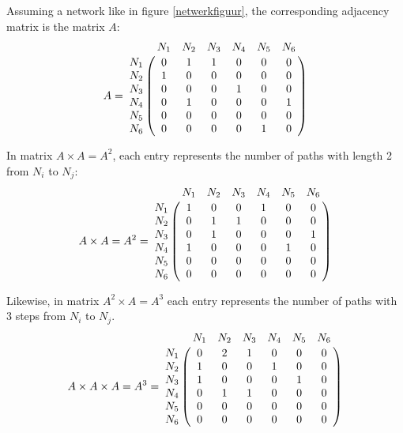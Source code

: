 Assuming a network like in figure \ref{netwerkfiguur}, the corresponding adjacency matrix is the  matrix $A$: \\

\begin{equation}
A =
\bordermatrix{
         & N_1		& N_2	& N_3	& N_4 	& N_5	&N_6     \cr
    N_1   & 0		& 1		& 1		& 0		& 0		& 0	     \cr
    N_2   & 1		& 0		& 0		& 0		& 0		& 0	     \cr
    N_3   & 0		& 0		& 0		& 1		& 0		& 0	     \cr
    N_4   & 0		& 1		& 0		& 0		& 0		& 1	     \cr
	N_5   & 0		& 0		& 0		& 0		& 0		& 0	     \cr
	N_6   & 0		& 0		& 0		& 0		& 1		& 0	     \cr
}
\end{equation}

In matrix $A \times A = A^{2}$, each entry represents the number of  paths with length 2 from $N_{i}$ to $N_{j}$:\\


\begin{equation}
 A \times A = A^{2} =
\bordermatrix{
         & N_1		& N_2	& N_3	& N_4 	& N_5	&N_6     \cr
    N_1   & 1		& 0		& 0		& 1		& 0		& 0	     \cr
    N_2   & 0		& 1		& 1		& 0		& 0		& 0	     \cr
    N_3   & 0		& 1		& 0		& 0		& 0		& 1 	     \cr
    N_4   & 1	    & 0		& 0		& 0		& 1		& 0	     \cr
	N_5   & 0		& 0		& 0		& 0		& 0		& 0	     \cr
	N_6   & 0		& 0		& 0		& 0		& 0		& 0	     \cr
}
\end{equation}

Likewise, in matrix $A^{2} \times A = A^{3}$ each entry represents the number of paths with 3 steps from $N_{i}$ to $N_{j}$.\\


\begin{equation}\label{5:13}
 A \times A \times A = A^{3} =
\bordermatrix{
         & N_1		& N_2	& N_3	& N_4 	& N_5	&N_6     \cr
    N_1   & 0		& 2		& 1		& 0		& 0		& 0	     \cr
    N_2   & 1		& 0		& 0		& 1		& 0		& 0	     \cr
    N_3   & 1		& 0		& 0		& 0		& 1		& 0	     \cr
    N_4   & 0		& 1		& 1		& 0		& 0		& 0	     \cr
	N_5   & 0		& 0		& 0		& 0		& 0		& 0	     \cr
	N_6   & 0		& 0		& 0		& 0		& 0		& 0	     \cr
}
\end{equation}


